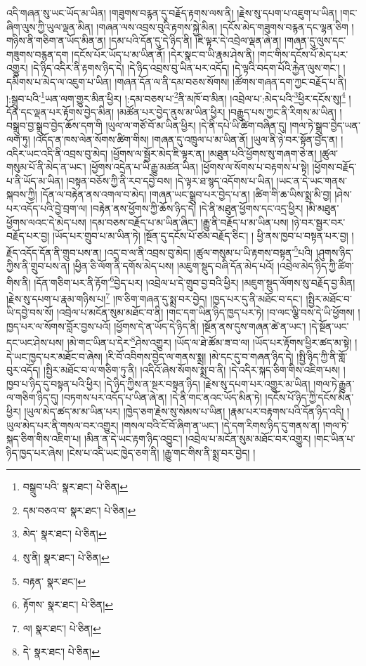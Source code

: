 འདི་གཞན་སུ་ཡང་ཡོད་མ་ཡིན། །གཟུགས་བརྙན་དུ་བརྗོད་རྟགས་ལས་ནི། །རྗེས་སུ་དཔག་པ་འཇུག་པ་ཡིན། །གང་ཞིག་ལུས་ཀྱི་ཡུལ་ལྡན་མིན། །གཞན་ལས་འབྲས་བུའི་རྟགས་སྐྱེ་མིན། །དངོས་མེད་གཟུགས་བརྙན་དང་ལྷན་ཅིག །གཉིས་ནི་གཅིག་ན་ཡོད་མིན་ན། །དམ་པའི་དོན་དུ་དེ་ཉིད་ནི། །ཇི་ལྟར་དེ་འབྲེལ་ལྡན་ཞེ་ན། །གཞན་དུ་ལུས་དང་གཟུགས་བརྙན་དག །དངོས་པོར་ཡོད་པ་མ་ཡིན་ནོ། །དེར་སྣང་བ་ཡི་རྣམ་ཤེས་ནི། །གང་གིས་དངོས་པོ་མེད་པར་འགྱུར། །དེ་ཉིད་འདིར་ནི་རྟགས་ཉིད་དེ། །དེ་ཉིད་འབྲས་བུ་ཡིན་པར་འདོད། །དེ་ལྟའི་བདག་པོའི་རྐྱེན་ལུས་གང་། །དམིགས་པ་མེད་ལ་འཇུག་པ་ཡིན། །གཞན་དོན་ལ་ནི་དམ་བཅས་སོགས། །ཚོགས་གཞན་དག་ཀྱང་བརྗོད་པ་ནི། །:སྒྲུབ་པའི་\footnote{བསྒྲུབ་པའི་  སྣར་ཐང་།  པེ་ཅིན། }ཡན་ལག་གྱུར་མིན་ཕྱིར། །:དམ་བཅས་པ་\footnote{དམ་བཅའ་བ་  སྣར་ཐང་།  པེ་ཅིན། }ནི་མཁོ་བ་མིན། །འབྲེལ་པ་:མེད་པའི་\footnote{མེད་  སྣར་ཐང་།  པེ་ཅིན། }ཕྱིར་དངོས་སུ།\footnote{སུ་ནི།  སྣར་ཐང་།  པེ་ཅིན། } །དོན་དང་ལྡན་པར་རྟོགས་བྱེད་མིན། །མཚོན་པར་བྱེད་ནུས་མ་ཡིན་ཕྱིར། །བརྒྱུད་པས་ཀྱང་ནི་རིགས་མ་ཡིན། །བསྒྲུབ་བྱ་སྒྲུབ་བྱེད་ཆོས་དག་གི །ཡུལ་ལ་གཙོ་བོ་མ་ཡིན་ཕྱིར། །དེ་ནི་དཔེ་ཡི་ཚིག་བཞིན་དུ། །གལ་ཏེ་སྒྲུབ་བྱེད་ཡན་ལག་ཏུ། །འདོད་ན་ཁས་ལེན་སོགས་ཚིག་གིས། །གཞན་དུ་འཁྲུལ་པ་མ་ཡིན་ནོ། །ཡུལ་ནི་ཉེ་བར་སྟོན་བྱེད་ན། །འདིར་ཡང་འདི་ནི་འབྲས་བུ་མེད། །ཕྱོགས་ལ་སྦྱོར་མེད་ཇི་ལྟར་ན། །མཐུན་པའི་ཕྱོགས་སུ་གཞག་ཅེ་ན། །ཚུལ་གསུམ་པོ་ནི་མེད་ན་ཡང་། །ཕྱོགས་འདྲེན་པ་ཡི་རྒྱུ་མཚན་ཡིན། །ཕྱོགས་ལ་སོགས་པ་བརྟགས་པ་སྟེ། །ཕྱོགས་བརྗོད་པ་ནི་ཡོད་མ་ཡིན། །བསྟན་བཅོས་ཀྱི་ནི་རབ་དབྱེ་བས། །དེ་ལྟར་ཐ་སྙད་འདོགས་པ་ཡིན། །ཡང་ན་དེ་ཡང་གནས་སྐབས་ཀྱི། །དོན་ལ་བརྟེན་ནས་འགལ་བ་མེད། །གཞན་ཡང་སྒྲུབ་པར་བྱེད་པ་ན། །ཚིག་གི་ཆ་ཡིས་སྨྲ་མི་བྱ། །ཤེས་པར་འདོད་པའི་བྱེ་བྲག་ལ། །བརྟེན་ནས་ཕྱོགས་ཀྱི་ཆོས་ཉིད་དེ། །དེ་ནི་མཐུན་ཕྱོགས་དང་འདྲ་ཕྱིར། །མི་མཐུན་ཕྱོགས་ལའང་དེ་མེད་པས། །དམ་བཅས་བརྗོད་པ་མ་ཡིན་ཞིང་། །རྒྱུ་ནི་བརྗོད་པ་མ་ཡིན་པས། །ཉེ་བར་སྦྱར་བར་བརྗོད་པར་བྱ། །ཡོད་པར་གྲུབ་པ་མ་ཡིན་ཏེ། །སྔོན་དུ་དངོས་པོ་ཙམ་བརྗོད་ཅིང་། །
ཕྱི་ནས་ཁྱབ་པ་བསྟན་པར་བྱ། །རྗོད་འདོད་དོན་ནི་གྲུབ་པས་ན། །འདྲ་བ་ལ་ནི་འབྲས་བུ་མེད། །ཚུལ་གསུམ་པ་ཡི་རྟགས་བསྟན་\footnote{བརྟན་  སྣར་ཐང་། }པའི། །ཤུགས་ཉིད་ཀྱིས་ནི་གྲུབ་པས་ན། །ཕྱིན་ཅི་ལོག་ནི་དགོས་མེད་པས། །མཇུག་སྡུད་བཞི་དོན་མེད་པའོ། །འབྲེལ་མེད་ཉིད་ཀྱི་ཚིག་གིས་ནི། །དོན་གཅིག་པར་ནི་རྟོག་\footnote{རྟོགས་  སྣར་ཐང་།  པེ་ཅིན། }བྱེད་པར། །འབྲེལ་པ་དེ་གྲུབ་བྱ་བའི་ཕྱིར། །མཇུག་སྡུད་ལོགས་སུ་བརྗོད་བྱ་མིན། །རྗེས་སུ་དཔག་པ་རྣམ་གཉིས་པ།\footnote{ལ།  སྣར་ཐང་།  པེ་ཅིན། } །ཁ་ཅིག་གཞན་དུ་སྨྲ་བར་བྱེད། །ཁྱད་པར་དུ་ནི་མཐོང་བ་དང་། །སྤྱིར་མཐོང་བ་ཡི་དབྱེ་བས་སོ། །འབྲེལ་པ་མངོན་སུམ་མཐོང་བ་ནི། །གང་དག་ཡིན་ཉིད་ཁྱད་པར་ཏེ། །བ་ལང་ལྕི་བས་དེ་ཡི་ཕྱོགས། །ཁྱད་པར་ལ་སོགས་བློར་བྱས་པའོ། །ཕྱོགས་དེ་ན་ཡོད་དེ་ཉིད་ནི། །སྔོན་ནས་དུས་གཞན་ཚེ་ན་ཡང་། །དེ་སྔོན་ཡང་དང་ཡང་ཤེས་པས། །མེ་གང་ཡིན་པ་དེར་\footnote{དེ་  སྣར་ཐང་།  པེ་ཅིན། }ཤེས་འགྱུར། །ཡོད་ལ་ཐེ་ཚོམ་ཟ་བ་ལ། །ཡོད་པར་རྟོགས་ཕྱིར་ཚད་མ་སྟེ། །དེ་ཡང་ཁྱད་པར་མཐོང་བ་ཞེས། །རི་བོ་འབིགས་བྱེད་ལ་གནས་སྨྲ། །མེ་དང་དུ་བ་གཞན་ཉིད་དེ། །སྤྱི་ཉིད་ཀྱི་ནི་གློ་བུར་འདོད། །སྤྱིར་མཐོང་བ་ལ་གཅིག་ཏུ་ནི། །འདིའོ་ཞེས་སོགས་སྨྲ་བ་ནི། །དེ་འདིར་སྐད་ཅིག་གིས་འཇིག་པས། །ཁྱབ་པ་ཉིད་དུ་བསྟན་པའི་ཕྱིར། །དེ་ཉིད་ཀྱིས་ན་སྔར་བསྟན་ཉིད། །རྗེས་སུ་དཔག་པར་འགྱུར་མ་ཡིན། །གལ་ཏེ་རྒྱུན་ལ་གཅིག་ཉིད་དུ། །བཏགས་པར་འདོད་པ་ཡིན་ཞེ་ན། །དེ་ནི་གང་ནའང་ཡོད་མིན་ཏེ། །དངོས་པོ་ཉིད་ཀྱི་དངོས་མིན་ཕྱིར། །ཡུལ་མེད་ཚད་མ་མ་ཡིན་པར། །ཁྱེད་ཅག་རྗེས་སུ་སེམས་པ་ཡིན། །རྣམ་པར་བརྟགས་པའི་དོན་ཉིད་འདི། །ཡུལ་མེད་པར་ནི་གསལ་བར་འགྱུར། །གསལ་བའི་ངོ་བོ་ཞིག་ན་ཡང་། །དེ་དག་རིགས་ཉིད་དུ་གནས་ན། །གལ་ཏེ་སྐད་ཅིག་གིས་འཇིག་པ། །མིན་ན་དེ་ཡང་རྟག་ཉིད་འབྱུང་། །འབྲེལ་པ་མངོན་སུམ་མཐོང་བར་འགྱུར། །གང་ཡིན་པ་ཉིད་ཁྱད་པར་ཞེས། །ངེས་པ་འདི་ཡང་ཁྱེད་ཅག་ནི། །རྒྱུ་གང་གིས་ནི་སྨྲ་བར་བྱེད། །
